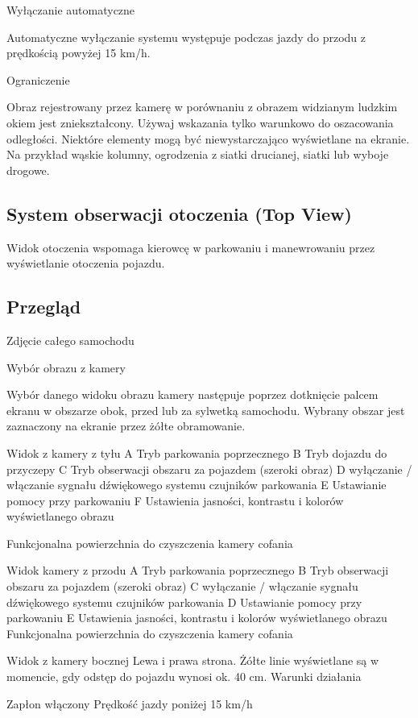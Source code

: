 Wyłączanie automatyczne

Automatyczne wyłączanie systemu występuje podczas jazdy do przodu z prędkością powyżej 15 km/h.

Ograniczenie

Obraz rejestrowany przez kamerę w porównaniu z obrazem widzianym ludzkim okiem jest zniekształcony. Używaj wskazania tylko warunkowo do oszacowania odległości.
Niektóre elementy mogą być niewystarczająco wyświetlane na ekranie. Na przykład wąskie kolumny, ogrodzenia z siatki drucianej, siatki lub wyboje drogowe.

\subsection{System obserwacji otoczenia (Top View)}

Widok otoczenia wspomaga kierowcę w parkowaniu i manewrowaniu przez wyświetlanie otoczenia pojazdu.

\subsection{Przegląd}

Zdjęcie całego samochodu

Wybór obrazu z kamery

Wybór danego widoku obrazu kamery następuje poprzez dotknięcie palcem ekranu w obszarze obok, przed lub za sylwetką samochodu. Wybrany obszar jest zaznaczony na ekranie przez żółte obramowanie.

Widok z kamery z tyłu
A Tryb parkowania poprzecznego
B Tryb dojazdu do przyczepy
C Tryb obserwacji obszaru za pojazdem (szeroki obraz)
D wyłączanie / włączanie sygnału dźwiękowego systemu czujników parkowania
E Ustawianie pomocy przy parkowaniu
F Ustawienia jasności, kontrastu i kolorów wyświetlanego obrazu

Funkcjonalna powierzchnia do czyszczenia kamery cofania

Widok kamery z przodu
A Tryb parkowania poprzecznego
B Tryb obserwacji obszaru za pojazdem (szeroki obraz)
C wyłączanie / włączanie sygnału dźwiękowego systemu czujników parkowania
D Ustawianie pomocy przy parkowaniu
E Ustawienia jasności, kontrastu i kolorów wyświetlanego obrazu
Funkcjonalna powierzchnia do czyszczenia kamery cofania

Widok z kamery bocznej
Lewa i prawa strona.
Żółte linie wyświetlane są w momencie, gdy odstęp do pojazdu wynosi ok. 40 cm.
Warunki działania
\begin{itemizeTick}
	\itemTick Zapłon włączony
	\itemTick Prędkość jazdy poniżej 15 km/h
\end{itemizeTick}

